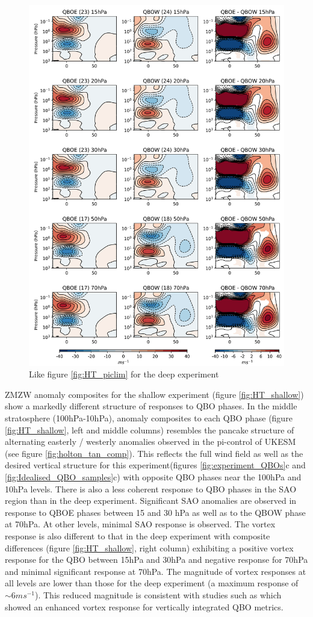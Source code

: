 \begin{figure}[h!]
\begin{center}
\noindent\includegraphics[width = 0.7\linewidth]{Figures/Figures-deepQBO/ZMZW_composites_QBO_phases_U_d_higher_DJFMQBO_vs_DJFM_70hPa_5thresh.png}
\caption[]{Like figure \ref{fig:HT_piclim} for the deep experiment}
\label{fig:HT_deep}
\end{center}
\end{figure}

ZMZW anomaly composites for the shallow experiment (figure \ref{fig:HT_shallow}) show a markedly different structure of responses to QBO phases. In the middle stratosphere (100hPa-10hPa), anomaly composites to each QBO phase (figure \ref{fig:HT_shallow}, left and middle columns) resembles the pancake structure of alternating easterly / westerly anomalies observed in the pi-control of UKESM (see figure \ref{fig:holton_tan_comp}). This reflects the full wind field as well as the desired vertical structure for this experiment(figures \ref{fig:experiment_QBOs}c and \ref{fig:Idealised_QBO_samples}c) with opposite QBO phases near the 100hPa and 10hPa levels. There is also a less coherent response to QBO phases in the SAO region than in the deep experiment. Significant SAO anomalies are observed in response to QBOE phases between 15 and 30 hPa as well as to the QBOW phase at 70hPa. At other levels, minimal SAO response is observed. The vortex response is also different to that in the deep experiment with composite differences (figure \ref{fig:HT_shallow}, right column) exhibiting a positive vortex response for the QBO between 15hPa and 30hPa and negative response for 70hPa and minimal significant response at 70hPa. The magnitude of vortex responses at all levels are lower than those for the deep experiment (a maximum response of $\sim 6 ms^{-1}$). This reduced magnitude is consistent with studies such as \cite{Gray2018} which showed an enhanced vortex response for vertically integrated QBO metrics.

